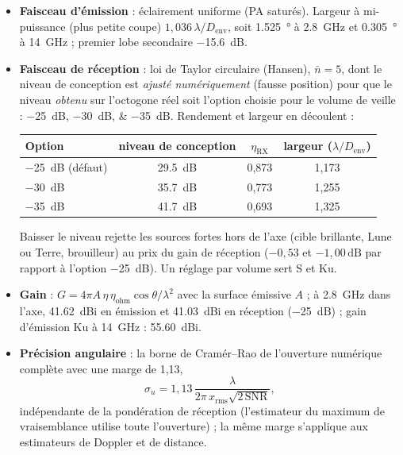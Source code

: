 \documentclass[11pt,a4paper]{article}
\newcommand{\dB}{\,\mathrm{dB}}
\newcommand{\SNR}{\mathrm{SNR}}
\newcommand{\Denv}{D_{\mathrm{env}}}
\begin{document}
\begin{itemize}
  \item \textbf{Faisceau d'émission} : éclairement uniforme (PA saturés). Largeur à mi-puissance (plus petite coupe)
        $1,036\,\lambda/\Denv$, soit \SI{1.525}{\degree} à \SI{2.8}{GHz} et \SI{0.305}{\degree} à \SI{14}{GHz} ;
        premier lobe secondaire \SI{-15.6}{dB}.
  \item \textbf{Faisceau de réception} : loi de Taylor circulaire (Hansen), $\bar n = 5$, dont le niveau de conception
        est \emph{ajusté numériquement} (fausse position) pour que le niveau \emph{obtenu} sur l'octogone réel soit
        l'option choisie pour le volume de veille : \SIlist{-25;-30;-35}{dB}. Rendement et largeur en découlent :
        \begin{center}
        \begin{tabular}{@{}lccc@{}}
        \toprule
        Option & niveau de conception & $\eta_{\mathrm{RX}}$ & largeur ($\lambda/\Denv$)\\
        \midrule
        \SI{-25}{dB} (défaut) & \SI{29.5}{dB} & 0,873 & 1,173\\
        \SI{-30}{dB} & \SI{35.7}{dB} & 0,773 & 1,255\\
        \SI{-35}{dB} & \SI{41.7}{dB} & 0,693 & 1,325\\
        \bottomrule
        \end{tabular}
        \end{center}
        Baisser le niveau rejette les sources fortes hors de l'axe (cible brillante, Lune ou Terre, brouilleur) au prix
        du gain de réception ($-0,53$ et $-1,00\dB$ par rapport à l'option \SI{-25}{dB}). Un réglage par volume sert S
        et Ku.
  \item \textbf{Gain} : $G = 4\pi A\,\eta\,\eta_{\mathrm{ohm}}\cos\theta/\lambda^2$ avec la surface émissive $A$ ; à
        \SI{2.8}{GHz} dans l'axe, \SI{41.62}{dBi} en émission et \SI{41.03}{dBi} en réception (\SI{-25}{dB}) ; gain
        d'émission Ku à \SI{14}{GHz} : \SI{55.60}{dBi}.
  \item \textbf{Précision angulaire} : la borne de Cramér--Rao de l'ouverture numérique complète avec une marge de
        1,13,
        \[ \sigma_u = 1,13\,\frac{\lambda}{2\pi\,x_{\mathrm{rms}}\sqrt{2\,\SNR}}, \]
        indépendante de la pondération de réception (l'estimateur du maximum de vraisemblance utilise toute
        l'ouverture) ; la même marge s'applique aux estimateurs de Doppler et de distance.
\end{itemize}
\end{document}
